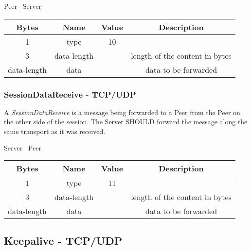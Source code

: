 \documentclass{article}
\begin{document}
    \begin{center}
        Peer \textrightarrow\ Server\\
        \begin{tabular}{|c|c|c|c|}
            \hline
            \textbf{Bytes} & \textbf{Name} & \textbf{Value} & \textbf{Description}           \\
            \hline
            1              & type          & 10             &                                \\
            \hline
            3              & data-length   &                & length of the content in bytes \\
            \hline
            data-length    & data          &                & data to be forwarded           \\
            \hline
        \end{tabular}
    \end{center}

    \subsubsection{SessionDataReceive - TCP/UDP}

    A \emph{SessionDataReceive} is a message being forwarded to a Peer from the Peer on the other side of the
    session. The Server SHOULD forward the message along the same transport as it was received.

    \begin{center}
        Server \textrightarrow\ Peer\\
        \begin{tabular}{|c|c|c|c|}
            \hline
            \textbf{Bytes} & \textbf{Name} & \textbf{Value} & \textbf{Description}           \\
            \hline
            1              & type          & 11             &                                \\
            \hline
            3              & data-length   &                & length of the content in bytes \\
            \hline
            data-length    & data          &                & data to be forwarded           \\
            \hline
        \end{tabular}
    \end{center}

    \subsection{Keepalive - TCP/UDP}
\end{document}
